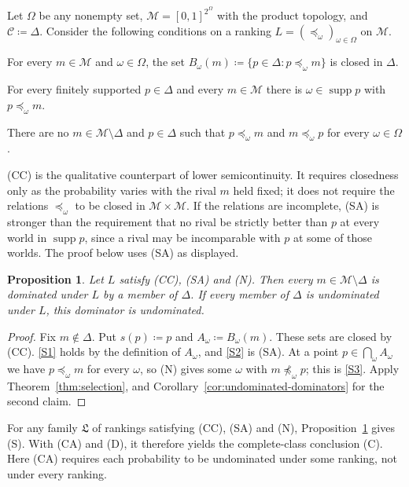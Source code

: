 \documentclass[11pt]{article}
\newenvironment{chgblockb}{\color{red}}{}
\newtheorem{proposition}[theorem]{Proposition}
\theoremstyle{definition}
\theoremstyle{remark}
\newcommand{\M}{\mathcal M}
\newcommand{\C}{\mathcal C}
\newcommand{\Lf}{\mathfrak L}
\newcommand{\supp}{\operatorname{supp}}
\begin{document}
\begin{chgblockb}
Let $\Omega$ be any nonempty set, $\M=[0,1]^{2^\Omega}$ with the product topology, and $\C\coloneqq\Delta$. Consider the following conditions on a ranking $L=(\preceq_\omega)_{\omega\in\Omega}$ on $\M$.
\begin{description}[leftmargin=1.5em,font=\normalfont\bfseries]
\item[(CC) Closed comparisons.] For every $m\in\M$ and $\omega\in\Omega$, the set $B_\omega(m)\coloneqq\{p\in\Delta:p\preceq_\omega m\}$ is closed in $\Delta$.
\item[(SA) Support coverage.] For every finitely supported $p\in\Delta$ and every $m\in\M$ there is $\omega\in\supp p$ with $p\preceq_\omega m$.
\item[(N) No incoherent ties.] There are no $m\in\M\setminus\Delta$ and $p\in\Delta$ such that $p\preceq_\omega m$ and $m\preceq_\omega p$ for every $\omega\in\Omega$.
\end{description}
(CC) is the qualitative counterpart of lower semicontinuity. It requires closedness only as the probability varies with the rival $m$ held fixed; it does not require the relations $\preceq_\omega$ to be closed in $\M\times\M$. If the relations are incomplete, (SA) is stronger than the requirement that no rival be strictly better than $p$ at every world in $\supp p$, since a rival may be incomparable with $p$ at some of those worlds. The proof below uses (SA) as displayed.

\begin{proposition}\label{prop:probabilism}
Let $L$ satisfy (CC), (SA) and (N). Then every $m\in\M\setminus\Delta$ is dominated under $L$ by a member of $\Delta$. If every member of $\Delta$ is undominated under $L$, this dominator is undominated.
\end{proposition}
\begin{proof}
Fix $m\notin\Delta$. Put $s(p)\coloneqq p$ and $A_\omega\coloneqq B_\omega(m)$. These sets are closed by (CC). \ref{S1} holds by the definition of $A_\omega$, and \ref{S2} is (SA). At a point $p\in\bigcap_\omega A_\omega$ we have $p\preceq_\omega m$ for every $\omega$, so (N) gives some $\omega$ with $m\not\preceq_\omega p$; this is \ref{S3}. Apply Theorem~\ref{thm:selection}, and Corollary~\ref{cor:undominated-dominators} for the second claim.
\end{proof}

For any family $\Lf$ of rankings satisfying (CC), (SA) and (N), Proposition~\ref{prop:probabilism} gives (S). With (CA) and (D), it therefore yields the complete-class conclusion (C). Here (CA) requires each probability to be undominated under some ranking, not under every ranking.


\end{chgblockb}
\end{document}
